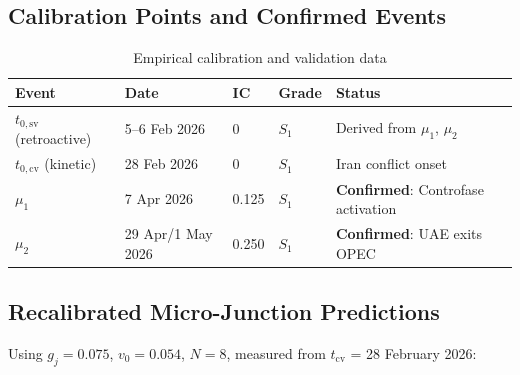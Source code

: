 \documentclass[12pt,a4paper]{article}
\newcommand{\gj}{g_j}
\begin{document}
\subsection{Calibration Points and Confirmed Events}

\begin{table}[H]
\centering
\caption{Empirical calibration and validation data}
\label{tab:calibration}
\begin{tabular}{@{}lllll@{}}
\toprule
\textbf{Event} & \textbf{Date} & \textbf{IC} & \textbf{Grade} & \textbf{Status} \\
\midrule
$t_{0,\mathrm{sv}}$ (retroactive) & 5--6 Feb 2026 & 0 & $S_1$ & Derived from $\mu_1$, $\mu_2$ \\
$t_{0,\mathrm{cv}}$ (kinetic) & 28 Feb 2026 & 0 & $S_1$ & Iran conflict onset \\
$\mu_1$ & 7 Apr 2026 & 0.125 & $S_1$ & \textbf{Confirmed}: Controfase activation \\
$\mu_2$ & 29 Apr/1 May 2026 & 0.250 & $S_1$ & \textbf{Confirmed}: UAE exits OPEC \\
\bottomrule
\end{tabular}
\end{table}

\subsection{Recalibrated Micro-Junction Predictions}\label{subsec:recal_predictions}

Using $\gj = 0.075$, $v_0 = 0.054$, $N = 8$, measured from $t_{\mathrm{cv}}$ = 28 February 2026:
\end{document}
